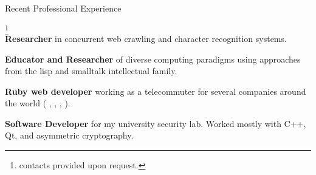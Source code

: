 \begin{rubric}{Recent Professional Experience}{
  \footnote{contacts provided upon request.}
  \\
  \entry*[2010 - Present]
  \textbf{Researcher} in concurrent web crawling and character
  recognition systems.

  \entry*[2009]
  \textbf{Educator and Researcher} of diverse computing paradigms
  using approaches from the lisp and smalltalk intellectual family.

  \entry*[2007-2009] \textbf{Ruby web developer} working as a
  telecommuter for several companies around the world (
  ,
  ,
  ,
   ).

  \entry*[2005 - 2007] 
  \textbf{Software Developer} for my university security lab. Worked
  mostly with C++, Qt, and asymmetric cryptography.  

}\end{rubric}

